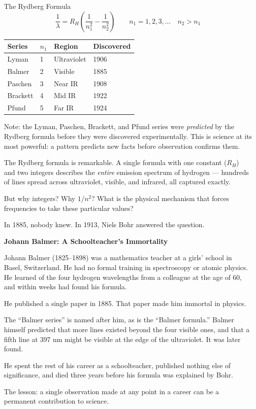 \documentclass[12pt, a4paper]{book}
\begin{document}
\begin{namedconcept}{The Rydberg Formula}
\[
  \frac{1}{\lambda} = R_H \left(\frac{1}{n_1^2} - \frac{1}{n_2^2}\right)
  \qquad n_1 = 1, 2, 3, \ldots \quad n_2 > n_1
\]
\vspace{-4pt}
\begin{center}
\begin{tabular}{llll}
\toprule
Series & $n_1$ & Region & Discovered \\
\midrule
Lyman   & 1 & Ultraviolet & 1906 \\
Balmer  & 2 & Visible     & 1885 \\
Paschen & 3 & Near IR     & 1908 \\
Brackett& 4 & Mid IR      & 1922 \\
Pfund   & 5 & Far IR      & 1924 \\
\bottomrule
\end{tabular}
\end{center}

Note: the Lyman, Paschen, Brackett, and Pfund series were
\emph{predicted} by the Rydberg formula before they were
discovered experimentally.
This is science at its most powerful: a pattern predicts
new facts before observation confirms them.
\end{namedconcept}

\vspace{0.5em}

The Rydberg formula is remarkable.
A single formula with one constant ($R_H$) and two integers
describes the \emph{entire} emission spectrum of hydrogen ---
hundreds of lines spread across ultraviolet, visible,
and infrared, all captured exactly.

But why integers?
Why $1/n^2$?
What is the physical mechanism that forces frequencies
to take these particular values?

In 1885, nobody knew.
In 1913, Niels Bohr answered the question.

\begin{historybox}
\textbf{Johann Balmer: A Schoolteacher's Immortality}

Johann Balmer (1825--1898) was a mathematics teacher at a girls'
school in Basel, Switzerland.
He had no formal training in spectroscopy or atomic physics.
He learned of the four hydrogen wavelengths from a colleague
at the age of 60, and within weeks had found his formula.

He published a single paper in 1885.
That paper made him immortal in physics.

The ``Balmer series'' is named after him, as is the
``Balmer formula.''
Balmer himself predicted that more lines existed beyond
the four visible ones, and that a fifth line at 397 nm
might be visible at the edge of the ultraviolet.
It was later found.

He spent the rest of his career as a schoolteacher,
published nothing else of significance,
and died three years before his formula was explained by Bohr.

The lesson: a single observation made at any point in a career
can be a permanent contribution to science.
\end{historybox}
\end{document}
